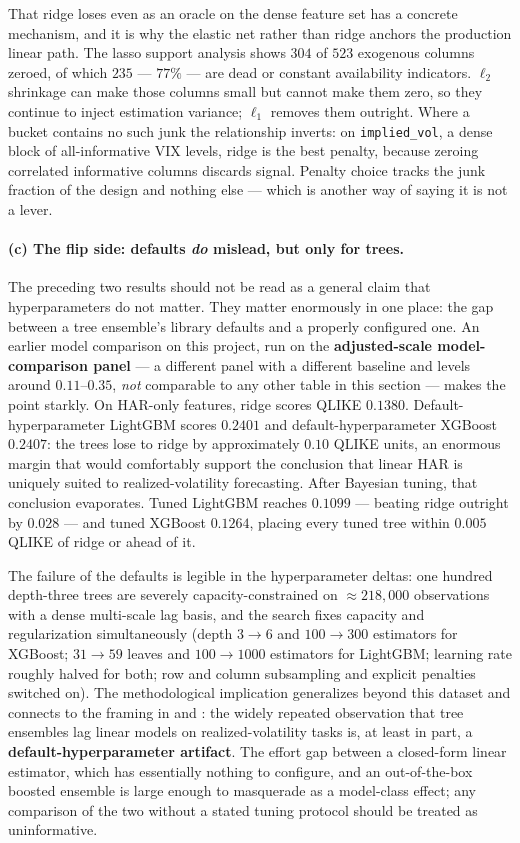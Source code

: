 That ridge loses even as an oracle on the dense feature set has a concrete
mechanism, and it is why the elastic net rather than ridge anchors the production
linear path. The lasso support analysis shows $304$ of $523$ exogenous columns
zeroed, of which $235$ --- $77\%$ --- are dead or constant availability
indicators. $\ell_2$ shrinkage can make those columns small but cannot make them
zero, so they continue to inject estimation variance; $\ell_1$ removes them
outright. Where a bucket contains no such junk the relationship inverts: on
\texttt{implied\_vol}, a dense block of all-informative VIX levels, ridge is the
best penalty, because zeroing correlated informative columns discards signal.
Penalty choice tracks the junk fraction of the design and nothing else --- which
is another way of saying it is not a lever.

\paragraph{(c) The flip side: defaults \emph{do} mislead, but only for trees.}
The preceding two results should not be read as a general claim that
hyperparameters do not matter. They matter enormously in one place: the gap
between a tree ensemble's library defaults and a properly configured one. An
earlier model comparison on this project, run on the \textbf{adjusted-scale
model-comparison panel} --- a different panel with a different baseline and
levels around $0.11$--$0.35$, \emph{not} comparable to any other table in this
section --- makes the point starkly. On HAR-only features, ridge scores QLIKE
$0.1380$. Default-hyperparameter LightGBM scores $0.2401$ and default-hyperparameter
XGBoost $0.2407$: the trees lose to ridge by approximately $0.10$ QLIKE units, an
enormous margin that would comfortably support the conclusion that linear HAR is
uniquely suited to realized-volatility forecasting. After Bayesian tuning, that
conclusion evaporates. Tuned LightGBM reaches $0.1099$ --- beating ridge outright
by $0.028$ --- and tuned XGBoost $0.1264$, placing every tuned tree within
$0.005$ QLIKE of ridge or ahead of it.

The failure of the defaults is legible in the hyperparameter deltas: one hundred
depth-three trees are severely capacity-constrained on $\approx 218{,}000$
observations with a dense multi-scale lag basis, and the search fixes capacity
and regularization simultaneously (depth $3 \to 6$ and $100 \to 300$ estimators
for XGBoost; $31 \to 59$ leaves and $100 \to 1000$ estimators for LightGBM;
learning rate roughly halved for both; row and column subsampling and explicit
penalties switched on). The methodological implication generalizes beyond this
dataset and connects to the framing in \citet{gu2020empirical} and
\citet{christensen2023machine}: the widely repeated observation that tree
ensembles lag linear models on realized-volatility tasks is, at least in part, a
\textbf{default-hyperparameter artifact}. The effort gap between a closed-form
linear estimator, which has essentially nothing to configure, and an
out-of-the-box boosted ensemble is large enough to masquerade as a model-class
effect; any comparison of the two without a stated tuning protocol should be
treated as uninformative.

